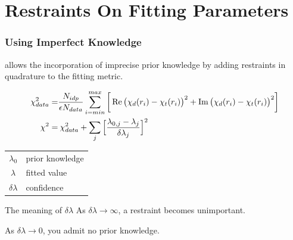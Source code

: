 \documentclass[10pt, xcolor=x11names, compress]{beamer}
\begin{document}
\section[Restraints]{Restraints On Fitting Parameters}
\begin{frame}
  \frametitle{Using Imperfect Knowledge}

  {\artemis} allows the incorporation of imprecise
  \alert{prior knowledge} by adding restraints in quadrature
  to the fitting metric.

  {\small
    \begin{align}
      \chi^2_{data} =& \frac{N_{idp}}{\epsilon N_{data}}
                      \sum\limits_{i=min}^{max} 
                        \bigg[\Re\big(\chi_d(r_i)-\chi_t(r_i)\big)^2 + 
                              \Im\big(\chi_d(r_i)-\chi_t(r_i)\big)^2\bigg]
                      \notag \\
     \chi^2 =& \> \chi^2_{data} + \sum\limits_{j}\Big[\frac{\lambda_{0,j} -
       \lambda_j}{\delta\lambda_j}\Big]^2 \label{eq:restraint}
   \end{align}
  }
  \begin{center}
    \begin{tabular}{cl}
      $\lambda_0$     & prior knowledge \\
      $\lambda$       & fitted value    \\
      $\delta\lambda$ & confidence      \\
    \end{tabular}
  \end{center}
  \begin{block}{The meaning of $\delta\lambda$}
      As $\delta\lambda\rightarrow\infty$, a restraint becomes unimportant.

      As $\delta\lambda\rightarrow0$, you admit no prior knowledge.
  \end{block}
\end{frame}
\end{document}

